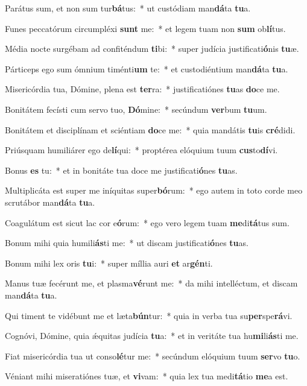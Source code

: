 \item Parátus sum, et non sum tur\textbf{bá}tus:~* ut custódiam man\textbf{dá}ta \textbf{tu}a.
\item Funes peccatórum circumpléxi \textbf{sunt} me:~* et legem tuam non \textbf{sum} ob\textbf{lí}tus.
\item Média nocte surgébam ad confiténdum \textbf{ti}bi:~* super judícia justificati\textbf{ó}nis \textbf{tu}æ.
\item Párticeps ego sum ómnium timénti\textbf{um} te:~* et custodiéntium man\textbf{dá}ta \textbf{tu}a.
\item Misericórdia tua, Dómine, plena est \textbf{ter}ra:~* justificatiónes \textbf{tu}as \textbf{do}ce me.
\item Bonitátem fecísti cum servo tuo, \textbf{Dó}mine:~* secúndum \textbf{ver}bum \textbf{tu}um.
\item Bonitátem et disciplínam et sciéntiam \textbf{do}ce me:~* quia mandátis \textbf{tu}is \textbf{cré}didi.
\item Priúsquam humiliárer ego de\textbf{lí}qui:~* proptérea elóquium tuum \textbf{cus}to\textbf{dí}vi.
\item Bonus \textbf{es} tu:~* et in bonitáte tua doce me justificati\textbf{ó}nes \textbf{tu}as.
\item Multiplicáta est super me iníquitas super\textbf{bó}rum:~* ego autem in toto corde meo scrutábor man\textbf{dá}ta \textbf{tu}a.
\item Coagulátum est sicut lac cor e\textbf{ó}rum:~* ego vero legem tuam \textbf{me}di\textbf{tá}tus sum.
\item Bonum mihi quia humili\textbf{ás}ti me:~* ut discam justificati\textbf{ó}nes \textbf{tu}as.
\item Bonum mihi lex oris \textbf{tu}i:~* super míllia auri \textbf{et} ar\textbf{gén}ti.
\item Manus tuæ fecérunt me, et plasma\textbf{vé}runt me:~* da mihi intelléctum, et discam man\textbf{dá}ta \textbf{tu}a.
\item Qui timent te vidébunt me et læta\textbf{bún}tur:~* quia in verba tua su\textbf{per}spe\textbf{rá}vi.
\item Cognóvi, Dómine, quia ǽquitas judícia \textbf{tu}a:~* et in veritáte tua hu\textbf{mi}li\textbf{ás}ti me.
\item Fiat misericórdia tua ut conso\textbf{lé}tur me:~* secúndum elóquium tuum \textbf{ser}vo \textbf{tu}o.
\item Véniant mihi miseratiónes tuæ, et \textbf{vi}vam:~* quia lex tua medi\textbf{tá}tio \textbf{me}a est.
